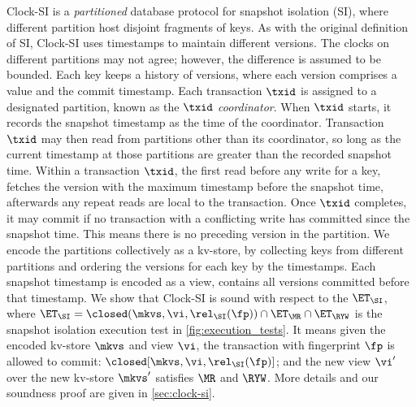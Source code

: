 Clock-SI is a \emph{partitioned} database protocol for snapshot isolation (SI),
where different partition host disjoint fragments of keys.
As with the original definition of SI, Clock-SI uses timestamps to maintain different versions. 
The clocks on different partitions may not agree; however, the difference is assumed to be bounded.
Each key keeps a history of versions, where each version comprises a value and the commit timestamp.
Each transaction $\txid$ is assigned to a designated partition, known as the $\txid$ \emph{coordinator}. 
When $\txid$ starts, it records the snapshot timestamp as the time of the coordinator.
Transaction $\txid$ may then read from partitions other than its coordinator,
so long as the current timestamp at those partitions are greater than the recorded snapshot time. 
Within a transaction \( \txid\), 
the first read before any write for a key, fetches the version with the maximum timestamp before the snapshot time,
afterwards any repeat reads are local to the transaction.
Once $\txid$ completes, it may commit if no transaction with a conflicting write has committed since the snapshot time.
This means there is no preceding version in the partition.
We encode the partitions collectively as a kv-store, by collecting keys from different partitions 
and ordering the versions for each key by the timestamps.
Each snapshot timestamp is encoded as a view, contains all versions committed before that timestamp.
We show that Clock-SI is sound with respect to the $\ET_\SI$, 
where $\ET_\SI = \closed(\mkvs,\vi, \rel_{\SI}(\fp)) \cap \ET_\MR \cap \ET_\RYW $ is the snapshot isolation execution test in \cref{fig:execution_tests}.
It means given the encoded kv-store \( \mkvs \) and view \( \vi \), 
the transaction with fingerprint \( \fp \) is allowed to commit: \( \closed[\mkvs,\vi,\rel_{\SI}(\fp)]\); and
the new view \( \vi' \) over the new kv-store \( \mkvs' \) satisfies \( \MR \) and \( \RYW \).
More details and our soundness proof are given in \cref{sec:clock-si}. 
